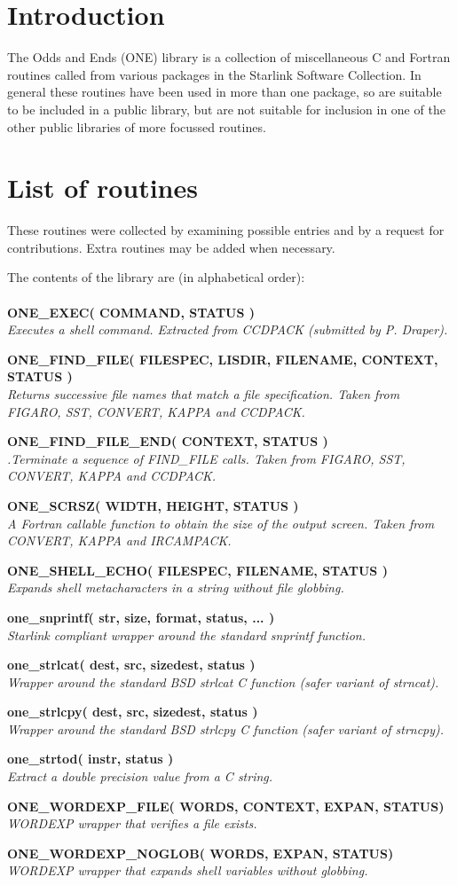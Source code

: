 \documentclass[twoside,11pt]{starlink}
\providecommand{\noteroutine}[2]{\textbf{#1}\hspace*{\fill}\nopagebreak \\
                             \hspace*{3em}\emph{#2}\hspace*{\fill}\par}
\begin{document}
\scfrontmatter

\section{Introduction}
The Odds and Ends  (ONE) library is a collection of
miscellaneous C and Fortran routines called from various packages
in the Starlink Software Collection.
In general these routines have been used in more than one package,
so are suitable to be included in a public library,
but are not suitable for inclusion in one of the other
public libraries of more focussed routines.
\section{List of routines}
These routines were collected by examining possible entries and
by a request for contributions.
Extra routines may be added when necessary.

The contents of the library are (in alphabetical order):\\
\\
\noteroutine{ONE\_EXEC( COMMAND, STATUS )}
    {Executes a shell command.
    Extracted from CCDPACK (submitted by P. Draper).}
\noteroutine{ONE\_FIND\_FILE( FILESPEC, LISDIR, FILENAME, CONTEXT, STATUS )}
    {Returns successive file names that match a file specification.
    Taken from FIGARO, SST, CONVERT, KAPPA and CCDPACK.}
\noteroutine{ONE\_FIND\_FILE\_END( CONTEXT, STATUS )}
    {.Terminate a sequence of FIND\_FILE calls.
    Taken from FIGARO, SST, CONVERT, KAPPA and CCDPACK.}
\noteroutine{ONE\_SCRSZ( WIDTH, HEIGHT, STATUS )}
    {A Fortran callable function to obtain the size of the output screen.
    Taken from CONVERT, KAPPA and IRCAMPACK.}
\noteroutine{ONE\_SHELL\_ECHO( FILESPEC, FILENAME, STATUS )}
    {Expands shell metacharacters in a string without file globbing.}
\noteroutine{one\_snprintf( str, size, format, status, ... )}
    {Starlink compliant wrapper around the standard snprintf function.}
\noteroutine{one\_strlcat( dest, src, sizedest, status )}
    {Wrapper around the standard BSD strlcat C function (safer variant
      of strncat).}
\noteroutine{one\_strlcpy( dest, src, sizedest, status )}
   {Wrapper around the standard BSD strlcpy C function (safer variant of strncpy).}
\noteroutine{one\_strtod( instr, status )}
   {Extract a double precision value from a C string.}
\noteroutine{ONE\_WORDEXP\_FILE( WORDS, CONTEXT, EXPAN, STATUS)}
  {WORDEXP wrapper that verifies a file exists.}
\noteroutine{ONE\_WORDEXP\_NOGLOB( WORDS, EXPAN, STATUS)}
  {WORDEXP wrapper that expands shell variables without globbing.}
\end{document}
